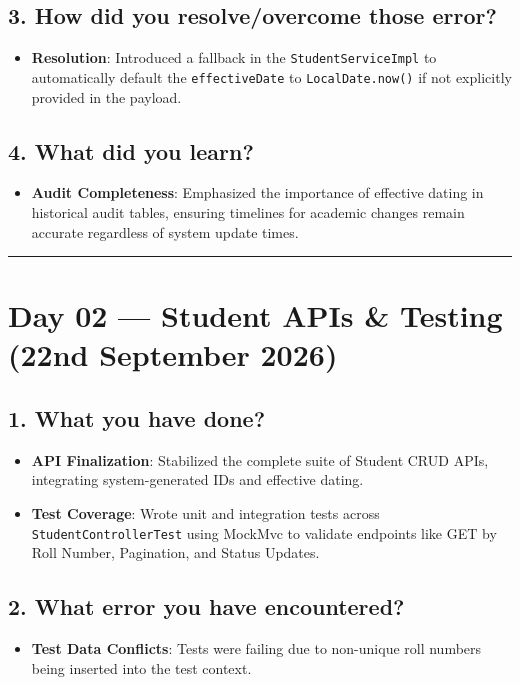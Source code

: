 \documentclass[12pt]{article}
\begin{document}
\subsection*{3. How did you resolve/overcome those error?}
\begin{itemize}
    \item \textbf{Resolution}: Introduced a fallback in the \texttt{StudentServiceImpl} to automatically default the \texttt{effectiveDate} to \texttt{LocalDate.now()} if not explicitly provided in the payload.
\end{itemize}

\subsection*{4. What did you learn?}
\begin{itemize}
    \item \textbf{Audit Completeness}: Emphasized the importance of effective dating in historical audit tables, ensuring timelines for academic changes remain accurate regardless of system update times.
\end{itemize}

\vspace{0.5cm}
\hrule
\vspace{0.5cm}

\section*{Day 02 --- Student APIs \& Testing (22nd September 2026)}

\subsection*{1. What you have done?}
\begin{itemize}
    \item \textbf{API Finalization}: Stabilized the complete suite of Student CRUD APIs, integrating system-generated IDs and effective dating.
    \item \textbf{Test Coverage}: Wrote unit and integration tests across \texttt{StudentControllerTest} using MockMvc to validate endpoints like GET by Roll Number, Pagination, and Status Updates.
\end{itemize}

\subsection*{2. What error you have encountered?}
\begin{itemize}
    \item \textbf{Test Data Conflicts}: Tests were failing due to non-unique roll numbers being inserted into the test context.
\end{itemize}
\end{document}
